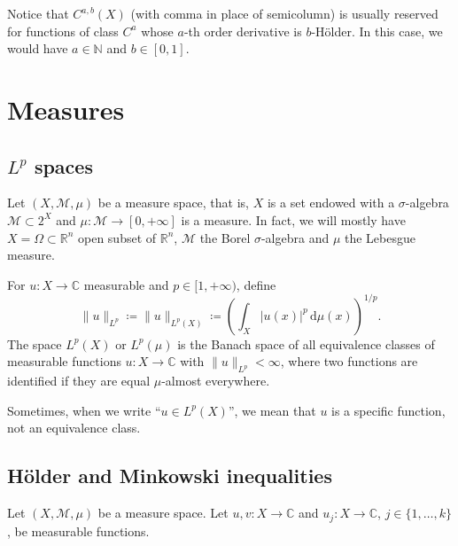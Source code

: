 \documentclass[a4paper,9pt]{amsart}
\newcommand{\scr}[1]{\mathscr{#1}}
\newcommand{\N}{\mathbb{N}}	%
\newcommand{\R}{\mathbb{R}}	%
\newcommand{\C}{\mathbb{C}}	%
\newcommand{\did}{\,\mathrm{d}}	%
\newcommand{\abs}[1]{\left\lvert #1 \right\rvert}
\theoremstyle{plain}
\theoremstyle{definition}
\theoremstyle{remark}
\begin{document}
Notice that $C^{a,b}(X)$ (with comma in place of semicolumn) is usually reserved for functions of class $C^a$ whose $a$-th order derivative is $b$-Hölder. 
In this case, we would have $a\in\N$ and $b\in[0,1]$.

\section{Measures}

\subsection{$L^p$ spaces}\label{subs6889e917}
Let $(X,\scr M,\mu)$ be a measure space, that is, $X$ is a set endowed with a $\sigma$-algebra $\scr M\subset 2^X$ and $\mu:\scr M\to[0,+\infty]$ is a measure.
In fact, we will mostly have $X=\Omega\subset\R^n$ open subset of $\R^n$,
$\scr M$ the Borel $\sigma$-algebra and $\mu$ the Lebesgue measure.

For $u:X\to\C$ measurable and $p\in[1,+\infty)$, define
\begin{equation}
	\|u\|_{L^p} 
	\coloneqq \|u\|_{L^p(X)}
	\coloneqq \left( \int_X \abs{u(x)}^p \did\mu(x) \right)^{1/p} .
\end{equation}
The space $L^p(X)$ or $L^p(\mu)$ is the Banach space of all equivalence classes of measurable functions $u:X\to\C$ with $\|u\|_{L^p}<\infty$, where two functions are identified if they are equal $\mu$-almost everywhere.

Sometimes, when we write ``$u\in L^p(X)$'', we mean that $u$ is a specific function, not an equivalence class.


\subsection{Hölder and Minkowski inequalities}

Let $(X,\scr M,\mu)$ be a measure space.
Let $u,v:X\to\C$ and $u_j:X\to\C$, $j\in\{1,\dots,k\}$, be measurable functions.

\end{document}
